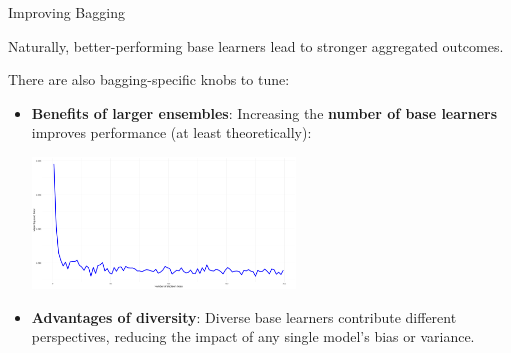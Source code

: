 \documentclass[11pt,compress,t,notes=noshow, xcolor=table]{beamer}
\begin{document}
\begin{vbframe}{Improving Bagging}

Naturally, better-performing base learners lead to stronger aggregated outcomes. \\

\vspace{1em}

There are also bagging-specific knobs to tune:
\begin{itemize}
  \item \textbf{Benefits of larger ensembles}: Increasing the \textbf{number of base learners} improves performance (at least theoretically): %
\begin{center}
\includegraphics[width=0.55\textwidth]{figure/bagging-ntree_MSE.png}
\end{center}
  \item \textbf{Advantages of diversity}: Diverse base learners contribute different perspectives, reducing the impact of any single model's bias or variance. %
\end{itemize}


\end{vbframe}

\endlecture
\end{document}

